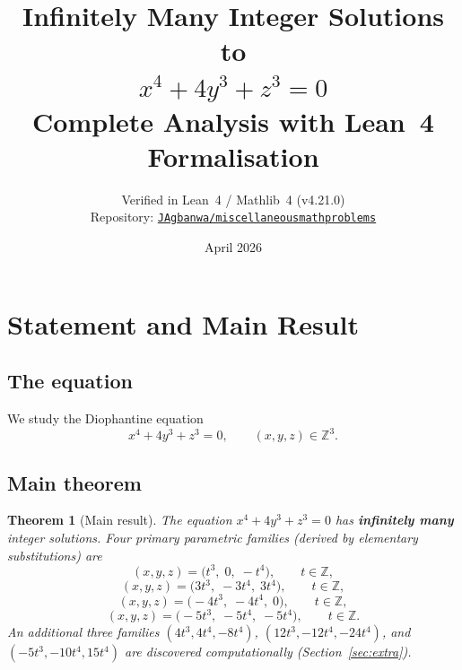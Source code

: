 \documentclass[12pt,a4paper]{article}
\title{%
  \Large\bfseries Infinitely Many Integer Solutions to\\[6pt]
  \Huge $x^4 + 4y^3 + z^3 = 0$\\[10pt]
  \large Complete Analysis with Lean~4 Formalisation
}
\author{%
  \normalsize Verified in Lean~4 / Mathlib~4 (v4.21.0)\\[2pt]
  \normalsize Repository: \href{https://github.com/JAgbanwa/miscellaneousmathproblems}%
    {\texttt{JAgbanwa/miscellaneousmathproblems}}
}
\date{\normalsize April 2026}
\newtheorem{theorem}{Theorem}[section]
\theoremstyle{definition}
\newcommand{\Z}{\mathbb{Z}}
\begin{document}
\maketitle
\tableofcontents
\newpage

\section{Statement and Main Result}\label{sec:intro}

\subsection{The equation}

We study the Diophantine equation
\begin{equation}\label{eq:main}
  x^4 + 4y^3 + z^3 = 0, \qquad (x,y,z)\in\Z^3. \tag{$\star$}
\end{equation}

\subsection{Main theorem}

\begin{theorem}[Main result]\label{thm:main}
  The equation $x^4 + 4y^3 + z^3 = 0$ has \textbf{infinitely many} integer solutions.
  Four primary parametric families (derived by elementary substitutions) are
  \begin{equation}\label{eq:family1}
    (x, y, z) = \bigl(t^3,\; 0,\; -t^4\bigr),
    \qquad t \in \Z,
  \end{equation}
  \begin{equation}\label{eq:family2}
    (x, y, z) = \bigl(3t^3,\; -3t^4,\; 3t^4\bigr),
    \qquad t \in \Z,
  \end{equation}
  \begin{equation}\label{eq:family3}
    (x, y, z) = \bigl(-4t^3,\; -4t^4,\; 0\bigr),
    \qquad t \in \Z,
  \end{equation}
  \begin{equation}\label{eq:family4}
    (x, y, z) = \bigl(-5t^3,\; -5t^4,\; -5t^4\bigr),
    \qquad t \in \Z.
  \end{equation}
  An additional three families $(4t^3, 4t^4, -8t^4)$,
  $(12t^3, -12t^4, -24t^4)$, and $(-5t^3, -10t^4, 15t^4)$
  are discovered computationally (Section~\ref{sec:extra}).
\end{theorem}
\end{document}
